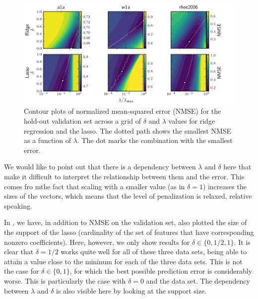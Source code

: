 \begin{figure}[htpb]
  \centering
  \includegraphics[]{plots/hyperopt_surfaces.pdf}
  \caption{%
    Contour plots of normalized mean-squared error (NMSE) for the hold-out validation set across a grid of \(\delta\) and \(\lambda\) values for ridge regression and the lasso. The dotted path shows the smallest NMSE as a function of \(\lambda\). The dot marks the combination with the smallest error.
  }
  \label{fig:hyperopt-contours}
\end{figure}

We would like to point out that there is a dependency between \(\lambda\) and \(\delta\) here that make it difficult to interpret the relationship between them and the error. This comes fro mthe fact that scaling with a smaller value (as in \(\delta = 1\)) increases the sizes of the vectors, which means that the level of penalization is relaxed, relative speaking.

In , we have, in addition to NMSE on the validation set, also plotted the size of the support of the lasso (cardinality of the set of features that have corresponding nonzero coefficients). Here, however, we only show results for \(\delta \in \{0, 1/2, 1\}\). It is clear that \(\delta = 1/2\) works quite well for all of these three data sets, being able to attain a value close to the mininum for each of the three data sets. This is not the case for \(\delta \in \{0, 1\}\), for which the best possible prediction error is considerably worse. This is particularly the case with \(\delta =0\) and the  data set. The dependency between \(\lambda\) and \(\delta\) is also visible here by looking at the support size.

